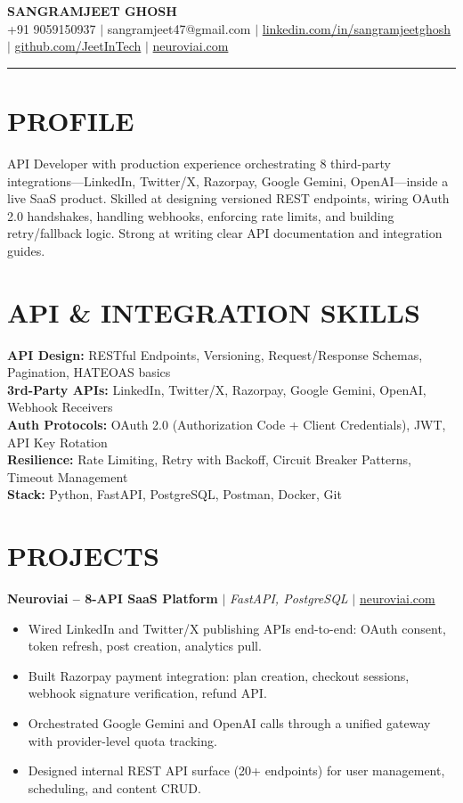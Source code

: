 \documentclass[10pt]{article}
\begin{document}
\begin{center}
{\Large \textbf{SANGRAMJEET GHOSH}} \\[2pt]
{\small +91 9059150937 $|$ sangramjeet47@gmail.com $|$
\href{https://www.linkedin.com/in/sangramjeetghosh}{linkedin.com/in/sangramjeetghosh} $|$
\href{https://github.com/JeetInTech}{github.com/JeetInTech} $|$
\href{https://neuroviai.com}{neuroviai.com}}
\end{center}

\noindent\rule{\textwidth}{0.4pt}

\section*{PROFILE}
API Developer with production experience orchestrating 8 third-party integrations---LinkedIn, Twitter/X, Razorpay, Google Gemini, OpenAI---inside a live SaaS product. Skilled at designing versioned REST endpoints, wiring OAuth 2.0 handshakes, handling webhooks, enforcing rate limits, and building retry/fallback logic. Strong at writing clear API documentation and integration guides.

\section*{API \& INTEGRATION SKILLS}
\textbf{API Design:} RESTful Endpoints, Versioning, Request/Response Schemas, Pagination, HATEOAS basics \\
\textbf{3rd-Party APIs:} LinkedIn, Twitter/X, Razorpay, Google Gemini, OpenAI, Webhook Receivers \\
\textbf{Auth Protocols:} OAuth 2.0 (Authorization Code + Client Credentials), JWT, API Key Rotation \\
\textbf{Resilience:} Rate Limiting, Retry with Backoff, Circuit Breaker Patterns, Timeout Management \\
\textbf{Stack:} Python, FastAPI, PostgreSQL, Postman, Docker, Git

\section*{PROJECTS}
\textbf{Neuroviai -- 8-API SaaS Platform} $|$ \textit{FastAPI, PostgreSQL} $|$ \href{https://neuroviai.com}{neuroviai.com}
\begin{itemize}
\item Wired LinkedIn and Twitter/X publishing APIs end-to-end: OAuth consent, token refresh, post creation, analytics pull.
\item Built Razorpay payment integration: plan creation, checkout sessions, webhook signature verification, refund API.
\item Orchestrated Google Gemini and OpenAI calls through a unified gateway with provider-level quota tracking.
\item Designed internal REST API surface (20+ endpoints) for user management, scheduling, and content CRUD.
\end{itemize}
\end{document}
